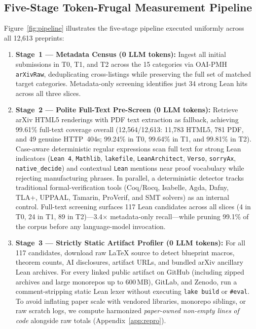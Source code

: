 \documentclass[11pt,letterpaper]{article}
\begin{document}
\subsection{Five-Stage Token-Frugal Measurement Pipeline}
\label{sec:five_stage}

Figure~\ref{fig:pipeline} illustrates the five-stage pipeline executed uniformly across all 12,613 preprints:
\begin{enumerate}
  \item \textbf{Stage~1 --- Metadata Census (0 LLM tokens):} Ingest all initial submissions in T0, T1, and T2 across the 15 categories via OAI-PMH \texttt{arXivRaw}, deduplicating cross-listings while preserving the full set of matched target categories. Metadata-only screening identifies just 34 strong Lean hits across all three slices.
  \item \textbf{Stage~2 --- Polite Full-Text Pre-Screen (0 LLM tokens):} Retrieve arXiv HTML5 renderings with PDF text extraction as fallback, achieving 99.61\% full-text coverage overall (12,564/12,613: 11,783 HTML5, 781 PDF, and 49 genuine HTTP~404s; 99.24\% in T0, 99.64\% in T1, and 99.81\% in T2). Case-aware deterministic regular expressions scan full text for strong Lean indicators (\texttt{Lean 4}, \texttt{Mathlib}, \texttt{lakefile}, \texttt{LeanArchitect}, \texttt{Verso}, \texttt{sorryAx}, \texttt{native\_decide}) and contextual \texttt{Lean} mentions near proof vocabulary while rejecting manufacturing phrases. In parallel, a deterministic detector tracks traditional formal-verification tools (Coq/Rocq, Isabelle, Agda, Dafny, TLA+, UPPAAL, Tamarin, ProVerif, and SMT solvers) as an internal control. Full-text screening surfaces 117 Lean candidates across all slices (4 in T0, 24 in T1, 89 in T2)---3.4$\times$ metadata-only recall---while pruning 99.1\% of the corpus before any language-model invocation.
  \item \textbf{Stage~3 --- Strictly Static Artifact Profiler (0 LLM tokens):} For all 117 candidates, download raw \LaTeX{} source to detect blueprint macros, theorem counts, AI disclosures, artifact URLs, and bundled arXiv ancillary Lean archives. For every linked public artifact on GitHub (including zipped archives and large monorepos up to 600\,MB), GitLab, and Zenodo, run a comment-stripping static Lean lexer without executing \texttt{lake build} or \texttt{\#eval}. To avoid inflating paper scale with vendored libraries, monorepo siblings, or raw scratch logs, we compute harmonized \emph{paper-owned non-empty lines of code} alongside raw totals (Appendix~\ref{app:repro}).

\end{enumerate}
\end{document}
